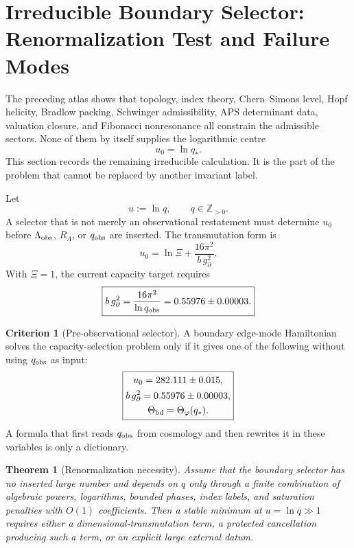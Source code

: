 \documentclass[aps,prd,reprint,nofootinbib,superscriptaddress,floatfix]{revtex4-2}
\numberwithin{equation}{section}
\theoremstyle{definition}
\newtheorem{criterion}{Criterion}[section]
\theoremstyle{plain}
\newtheorem{theorem}{Theorem}[section]
\begin{document}
\section{Irreducible Boundary Selector: Renormalization Test and Failure Modes}

The preceding atlas shows that topology, index theory, Chern--Simons level,
Hopf helicity, Bradlow packing, Schwinger admissibility, APS determinant
data, valuation closure, and Fibonacci nonresonance all constrain the
admissible sectors.  None of them by itself supplies the logarithmic centre
\[
        u_0=\ln q_* .
\]
This section records the remaining irreducible calculation.  It is the
part of the problem that cannot be replaced by another invariant label.

Let
\begin{equation}
        u:=\ln q,
        \qquad
        q\in\mathbb Z_{>0}.
\end{equation}
A selector that is not merely an observational restatement must determine
\(u_0\) before \(\Lambda_{\rm obs}\), \(R_\Lambda\), or \(q_{\rm obs}\) are
inserted.  The transmutation form is
\begin{equation}
        u_0=\ln\Xi+\frac{16\pi^2}{b\,g_\partial^2}.
\end{equation}
With \(\Xi=1\), the current capacity target requires
\begin{equation}
\boxed{
        b\,g_\partial^2
        =\frac{16\pi^2}{\ln q_{\rm obs}}
        =0.55976\pm0.00003 .
}
\label{eq:preobs-target-coupling}
\end{equation}

\begin{criterion}[Pre-observational selector]
A boundary edge-mode Hamiltonian solves the capacity-selection problem only
if it gives one of the following without using \(q_{\rm obs}\) as input:
\begin{equation}
\boxed{
\begin{gathered}
        u_0=282.111\pm0.015,\\
        b\,g_\partial^2=0.55976\pm0.00003,\\
        \Theta_{\rm bd}=\Theta_\varphi(q_*).
\end{gathered}}
\end{equation}
A formula that first reads \(q_{\rm obs}\) from cosmology and then rewrites
it in these variables is only a dictionary.
\end{criterion}

\begin{theorem}[Renormalization necessity]
Assume that the boundary selector has no inserted large number and depends
on \(q\) only through a finite combination of algebraic powers, logarithms,
bounded phases, index labels, and saturation penalties with \(O(1)\)
coefficients.  Then a stable minimum at \(u=\ln q\gg1\) requires either a
dimensional-transmutation term, a protected cancellation producing such a
term, or an explicit large external datum.
\end{theorem}
\end{document}
